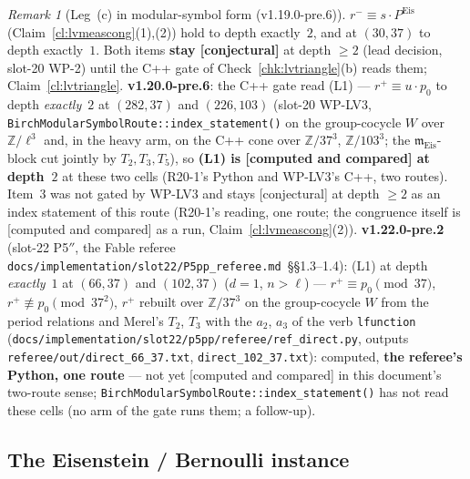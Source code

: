 \documentclass[11pt]{article}
\theoremstyle{remark}
\newtheorem{remark}[theorem]{Remark}
\newcommand{\Z}{\mathbb{Z}}
\newcommand{\m}{\mathfrak{m}}
\newcommand{\CONJ}{\textsf{[conjectural]}}
\newcommand{\CMPD}{\textsf{[computed and compared]}}   %
\begin{document}
\begin{remark}[Leg~(c) in modular-symbol form (v1.19.0-pre.6)]
$r^{-}\equiv s\cdot P^{\mathrm{Eis}}$ (Claim~\ref{cl:lvmeascong}(1),(2)) hold to depth exactly~$2$, and at $(30,37)$ to depth exactly~$1$. Both items \textbf{stay \CONJ} at depth $\ge2$ (lead decision,
slot-20 WP-2) until the C++ gate of Check~\ref{chk:lvtriangle}(b) reads them; Claim~\ref{cl:lvtriangle}. \textbf{v1.20.0-pre.6}: the C++ gate read (L1) --- $r^{+}\equiv u\cdot p_0$ to depth
\emph{exactly}~$2$ at $(282,37)$ and $(226,103)$ (slot-20 WP-LV3, \texttt{BirchModularSymbolRoute::index\_statement()} on the group-cocycle $W$ over $\Z/\ell^{3}$ and, in the heavy arm, on the C++ cone
over $\Z/37^{3}$, $\Z/103^{3}$; the $\m_{\mathrm{Eis}}$-block cut jointly by $T_2,T_3,T_5$), so \textbf{(L1) is \CMPD{} at depth~$2$} at these two cells (R20-1's Python and WP-LV3's C++, two routes).
Item~3 was not gated by WP-LV3 and stays \CONJ{} at depth $\ge2$ as an index statement of this route (R20-1's reading, one route; the congruence itself is \CMPD{} as a run, Claim~\ref{cl:lvmeascong}(2)).
\textbf{v1.22.0-pre.2} (slot-22 P5$''$, the Fable referee \texttt{docs/implementation/slot22/P5pp\_referee.md}~\S\S1.3--1.4): (L1) at depth \emph{exactly}~$1$ at $(66,37)$ and $(102,37)$ ($d=1$, $n>\ell$) --- $r^{+}\equiv p_0\pmod{37}$,
$r^{+}\not\equiv p_0\pmod{37^{2}}$, $r^{+}$ rebuilt over $\Z/37^{3}$ on the group-cocycle $W$ from the period relations and Merel's $T_2$, $T_3$ with the $a_2$, $a_3$ of the verb \texttt{lfunction}
(\texttt{docs/implementation/slot22/p5pp/referee/ref\_direct.py}, outputs \texttt{referee/out/direct\_66\_37.txt}, \texttt{direct\_102\_37.txt}): computed, \textbf{the referee's Python, one route} --- not yet \CMPD{}
in this document's two-route sense; \texttt{BirchModularSymbolRoute::index\_statement()} has not read these cells (no arm of the gate runs them; a follow-up).
\end{remark}

\subsection{The Eisenstein / Bernoulli instance}\label{sec:lveis}
\end{document}

